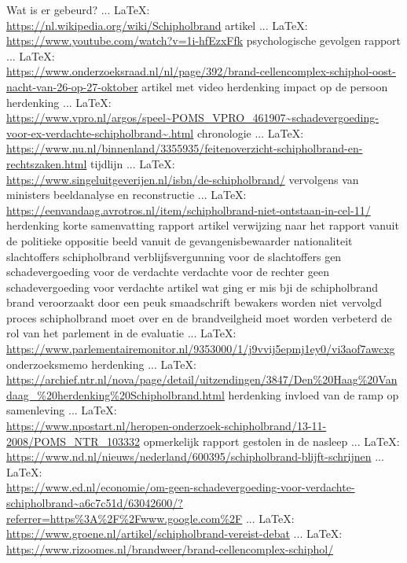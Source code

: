 \begin{thebibliography}{99}
{{{	Wat is er gebeurd?
	 ... \LaTeX:\\ \url{https://nl.wikipedia.org/wiki/Schipholbrand}
	artikel
	 ... \LaTeX:\\ \url{https://www.youtube.com/watch?v=1i-hfEzxFfk}
	psychologische gevolgen
	rapport
	 ... \LaTeX:\\ \url{https://www.onderzoeksraad.nl/nl/page/392/brand-cellencomplex-schiphol-oost-nacht-van-26-op-27-oktober}
	artikel met video
	herdenking
	impact op de persoon
	herdenking
	 ... \LaTeX:\\ \url{https://www.vpro.nl/argos/speel~POMS_VPRO_461907~schadevergoeding-voor-ex-verdachte-schipholbrand~.html}
	chronologie
	 ... \LaTeX:\\ \url{https://www.nu.nl/binnenland/3355935/feitenoverzicht-schipholbrand-en-rechtszaken.html}
	tijdlijn
	 ... \LaTeX:\\ \url{https://www.singeluitgeverijen.nl/isbn/de-schipholbrand/}
	vervolgens van ministers
	beeldanalyse en reconstructie
	 ... \LaTeX:\\ \url{https://eenvandaag.avrotros.nl/item/schipholbrand-niet-ontstaan-in-cel-11/}
	herdenking
	korte samenvatting
	rapport
	artikel
	verwijzing naar het rapport vanuit de politieke oppositie
	beeld vanuit de gevangenisbewaarder
	nationaliteit slachtoffers schipholbrand
	verblijfsvergunning voor de slachtoffers
	gen schadevergoeding voor de verdachte
	verdachte voor de rechter
	geen schadevergoeding voor verdachte
	artikel wat ging er mis bji de schipholbrand
	brand veroorzaakt door een peuk
	smaadschrift
	bewakers worden niet vervolgd
	proces schipholbrand moet over en de brandveilgheid moet worden verbeterd
	de rol van het parlement in de evaluatie
	 ... \LaTeX:\\ \url{https://www.parlementairemonitor.nl/9353000/1/j9vvij5epmj1ey0/vi3aof7awcxg}
	onderzoeksmemo
	herdenking
	 ... \LaTeX:\\ \url{https://archief.ntr.nl/nova/page/detail/uitzendingen/3847/Den%20Haag%20Vandaag_%20herdenking%20Schipholbrand.html}
	herdenking
	invloed van de ramp op samenleving
	 ... \LaTeX:\\ \url{https://www.npostart.nl/heropen-onderzoek-schipholbrand/13-11-2008/POMS_NTR_103332}
	opmerkelijk rapport gestolen in de nasleep
	 ... \LaTeX:\\ \url{https://www.nd.nl/nieuws/nederland/600395/schipholbrand-blijft-schrijnen}
	 ... \LaTeX:\\ \url{https://www.ed.nl/economie/om-geen-schadevergoeding-voor-verdachte-schipholbrand~a6c7c51d/63042600/?referrer=https%3A%2F%2Fwww.google.com%2F}
	 ... \LaTeX:\\ \url{https://www.groene.nl/artikel/schipholbrand-vereist-debat}
	 ... \LaTeX:\\ \url{https://www.rizoomes.nl/brandweer/brand-cellencomplex-schiphol/}
	
}}}
\end{thebibliography}
